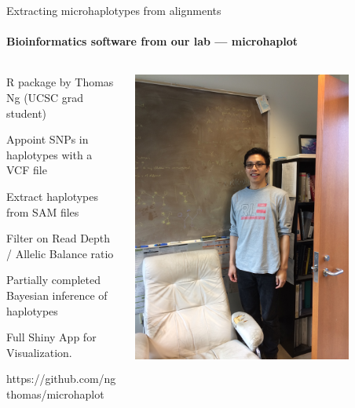 \documentclass[letter,graphicx]{beamer}
\begin{document}
\begin{frame}{Extracting microhaplotypes from alignments}
\framesubtitle{Bioinformatics software from our lab --- {\sc microhaplot}}

\begin{columns}
\begin{column}{0.5\textwidth}
\begin{itemize}
{\small
\item R package by Thomas Ng (UCSC grad student)
\item Appoint SNPs in haplotypes with a VCF file
\item Extract haplotypes from SAM files
\item Filter on Read Depth / Allelic Balance ratio
\item Partially completed Bayesian inference of haplotypes
\item Full Shiny App for Visualization.
}
{\tiny https://github.com/ngthomas/microhaplot}
\end{itemize}
\end{column}
\begin{column}{0.5\textwidth}
\includegraphics[width = 0.8\textwidth]{figs/thomas.jpg}
\end{column}
\end{columns}

\end{frame}
\end{document}
